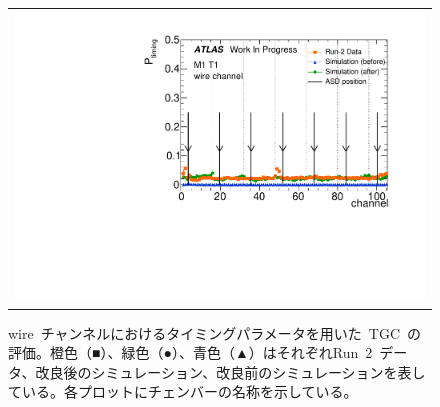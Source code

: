 \begin{figure}[htbp]
\begin{tabular}{l}
			\begin{minipage}{0.22\hsize}
				\includegraphics[width=\textwidth,page=42]{img/pdf5/master_timingplot_comp.pdf}
			\end{minipage}
			\vspace{0.5cm}\\ 

		\end{tabular}
		\caption[wire~チャンネルにおけるタイミングパラメータを用いた~TGC~の評価。]{wire~チャンネルにおけるタイミングパラメータを用いた~TGC~の評価。橙色（■）、緑色（●）、青色（▲）はそれぞれRun~2~データ、改良後のシミュレーション、改良前のシミュレーションを表している。各プロットにチェンバーの名称を示している。}
		\label{fig:timingPlotCompWire}
	\end{figure}
    
